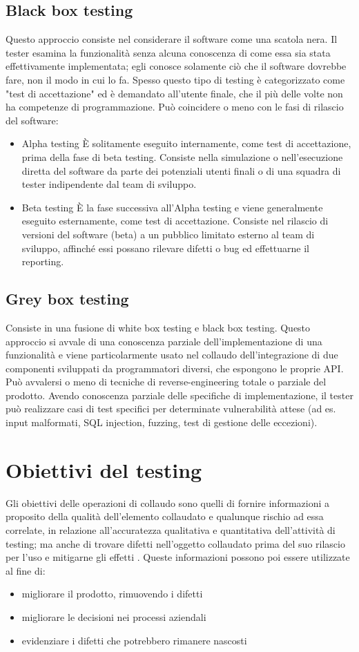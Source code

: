 \documentclass[../main.tex]{subfiles}
\begin{document}
\subsection{Black box testing}
Questo approccio consiste nel considerare il software come una scatola nera.
Il tester esamina la funzionalità senza alcuna conoscenza di come essa sia stata effettivamente implementata; egli conosce solamente ciò che il software dovrebbe fare, non il modo in cui lo fa.
Spesso questo tipo di testing è categorizzato come "test di accettazione" ed è demandato all'utente finale, che il più delle volte non ha competenze di programmazione.
Può coincidere o meno con le fasi di rilascio del software:
\begin{itemize}
\item Alpha testing
\`E solitamente eseguito internamente, come test di accettazione, prima della fase di beta testing.
Consiste nella simulazione o nell'esecuzione diretta del software da parte dei potenziali utenti finali o di una squadra di tester indipendente dal team di sviluppo.
\item Beta testing
\`E la fase successiva all'Alpha testing e viene generalmente eseguito esternamente, come test di accettazione.
Consiste nel rilascio di versioni del software (beta) a un pubblico limitato esterno al team di sviluppo, affinché essi possano rilevare difetti o bug ed effettuarne il reporting.
\end{itemize}
\subsection{Grey box testing}
Consiste in una fusione di white box testing e black box testing.
Questo approccio si avvale di una conoscenza parziale dell'implementazione di una funzionalità e viene particolarmente usato nel collaudo dell'integrazione di due componenti sviluppati da programmatori diversi, che espongono le proprie API.
Può avvalersi o meno di tecniche di reverse-engineering totale o parziale del prodotto.
Avendo conoscenza parziale delle specifiche di implementazione, il tester può realizzare casi di test specifici per determinate vulnerabilità attese (ad es. input malformati, SQL injection, fuzzing, test di gestione delle eccezioni).
\section{Obiettivi del testing}
Gli obiettivi delle operazioni di collaudo sono quelli di fornire informazioni a proposito della qualità dell'elemento collaudato e qualunque rischio ad essa correlate, in relazione all'accuratezza qualitativa e quantitativa dell'attività di testing; ma anche di trovare difetti nell'oggetto collaudato prima del suo rilascio per l'uso e mitigarne gli effetti \cite{iso29119}.
Queste informazioni possono poi essere utilizzate al fine di:
\begin{itemize}
\item migliorare il prodotto, rimuovendo i difetti
\item migliorare le decisioni nei processi aziendali
\item evidenziare i difetti che potrebbero rimanere nascosti
\end{itemize}
\end{document}
